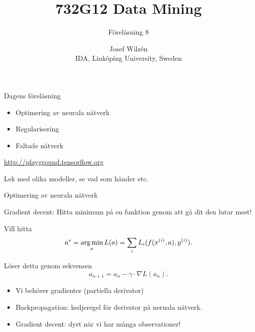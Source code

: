 \documentclass[10pt,english]{beamer}
\title{732G12 Data Mining}
\subtitle{Föreläsning 8}
\date{}
\author{Josef Wilzén \\ IDA, Linköping University, Sweden}
\begin{document}
\maketitle

\begin{frame}{Dagens föreläsning}

    \begin{itemize}
        \item Optimering av neurala nätverk
        \item Regularisering
        \item Faltade nätverk
    \end{itemize}

    \url{http://playground.tensorflow.org}

    Lek med olika modeller, se vad som händer etc.
    
\end{frame}

\begin{frame}{Optimering av neurala nätverk}
    
    Gradient decent: Hitta minimum på en funktion genom att gå dit den lutar mest!

    Vill hitta
    \begin{equation*}
        a^* = \operatorname*{arg\,min}_a L(a) = \sum_i L_i(f(x^{(i)},a), y^{(i)}).
    \end{equation*}

    Löser detta genom sekvensen
    \begin{equation*}
        a_{n+1} = a_n - \gamma \cdot \nabla L(a_n).
    \end{equation*}

    \begin{itemize}
        \item Vi behöver gradienter (partiella derivator)
        \item Backpropagation: kedjeregel för derivator på neruala nätverk.
        \item Gradient decent: dyrt när vi har många observationer!
    \end{itemize}

\end{frame}
\end{document}
